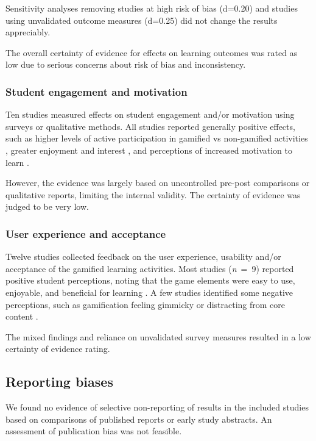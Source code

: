 \documentclass[
	hf,
	]{ceurart}
\begin{document}
		Sensitivity analyses removing studies at high risk of bias (d=0.20) and studies using unvalidated outcome measures (d=0.25) did not change the results appreciably.
		
		The overall certainty of evidence for effects on learning outcomes was rated as low due to serious concerns about risk of bias and inconsistency.
		
		\subsubsection{Student engagement and motivation}
		
		Ten studies measured effects on student engagement and/or motivation using surveys or qualitative methods. All studies reported generally positive effects, such as higher levels of active participation in gamified vs non-gamified activities \cite{Berkling2013}, greater enjoyment and interest \cite{Morales-Trujillo2021, Akpolat2014149}, and perceptions of increased motivation to learn \cite{Matsubara2017, Hasan2018}. 
		
		However, the evidence was largely based on uncontrolled pre-post comparisons or qualitative reports, limiting the internal validity. The certainty of evidence was judged to be very low.
		
		\subsubsection{User experience and acceptance}
		
		Twelve studies collected feedback on the user experience, usability and/or acceptance of the gamified learning activities. Most studies (\textit{n}~=~9) reported positive student perceptions, noting that the game elements were easy to use, enjoyable, and beneficial for learning \cite{Mora2016, Iosup2014, Berkling2013, Matsubara2017}. A few studies identified some negative perceptions, such as gamification feeling gimmicky or distracting from core content \cite{Morales-Trujillo2021, Akpolat2014149}.
		
		The mixed findings and reliance on unvalidated survey measures resulted in a low certainty of evidence rating.
		
		\subsection{Reporting biases}
		
		We found no evidence of selective non-reporting of results in the included studies based on comparisons of published reports or early study abstracts. An assessment of publication bias was not feasible.
		
\end{document}
